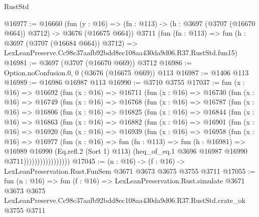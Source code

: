 \begin{lexlean}{RustStd}
\begin{coremodule}
@16977 := @16660
    (fun (y : @16) => (fn : @113) -> (h : @3697 (@3707 (@16670 @664)) @3712) -> @3676 (@16675 @664))
    @3711
    (fun (fn : @113) =>
    fun (h : @3697 (@3707 (@16684 @664)) @3712) =>
    LexLeanPreserve.Cc98c37aafb92bdd8ec108aa430da9d06.R37.RustStd.fun15)
@16981 := @3697 (@3707 (@16670 @669)) @3712
@16986 := Option.noConfusion.{0, 0} (@3676 (@16675 @669)) @113
@16987 := @1406 @113
@16989 := @16986 @16987 @113
@16990 := @3710 @3755
@17037 := fun (x : @16) =>
  @16692
    (fun (x : @16) =>
    @16711
      (fun (x : @16) =>
      @16730
        (fun (x : @16) =>
        @16749
          (fun (x : @16) =>
          @16768
            (fun (x : @16) =>
            @16787
              (fun (x : @16) =>
              @16806
                (fun (x : @16) =>
                @16825
                  (fun (x : @16) =>
                  @16844
                    (fun (x : @16) =>
                    @16863
                      (fun (x : @16) =>
                      @16882
                        (fun (x : @16) =>
                        @16901
                          (fun (x : @16) =>
                          @16920
                            (fun (x : @16) =>
                            @16939
                              (fun (x : @16) =>
                              @16958
                                (fun (x : @16) =>
                                @16977
                                  (fun (x : @16) =>
                                  fun (fn : @113) =>
                                  fun (h : @16981) =>
                                  @16989
                                    @16990
                                    (Eq.refl.{2} (Sort 1) @113)
                                    (heq_of_eq.{1} @3696 @16987 @16990 @3711)))))))))))))))))
@17045 := (n : @16) -> (f : @16) -> LexLeanPreservation.Rust.FunSem @3671 @3673 @3675 @3755 @3711
@17055 := fun (n : @16) =>
  fun (f : @16) =>
  LexLeanPreservation.Rust.simulate
    @3671
    @3673
    @3675
    LexLeanPreserve.Cc98c37aafb92bdd8ec108aa430da9d06.R37.RustStd.crate_ok
    @3755
    @3711
\end{coremodule}
\end{lexlean}
